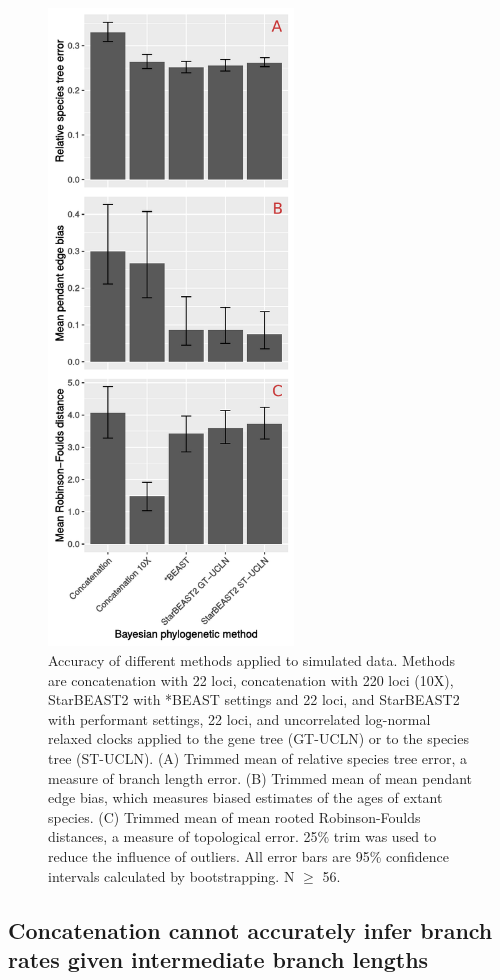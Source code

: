 \documentclass[12pt]{article}
\begin{document}
\begin{figure}[htb!]
\centering
\includegraphics[width=6.5cm]{tree_error.pdf}
\caption
{Accuracy of different methods applied to simulated data. Methods are concatenation with 22 loci, concatenation with 220 loci
(10X), StarBEAST2 with *BEAST settings and 22 loci, and StarBEAST2 with
performant settings, 22 loci, and uncorrelated log-normal relaxed clocks applied
to the gene tree (GT-UCLN) or to the species tree (ST-UCLN). (A) Trimmed mean of
relative species tree error, a measure of branch length error. (B) Trimmed
mean of mean pendant edge bias, which measures biased estimates of the ages of
extant species. (C) Trimmed mean of mean rooted Robinson-Foulds distances, a
measure of topological error. 25\% trim was used to reduce the
influence of outliers. All error bars are 95\% confidence intervals calculated
by bootstrapping. N $\ge$ 56.}
\label{fig:speciesTreeError}
\end{figure}

\subsection*{Concatenation cannot accurately infer branch rates given intermediate branch lengths}
\end{document}
